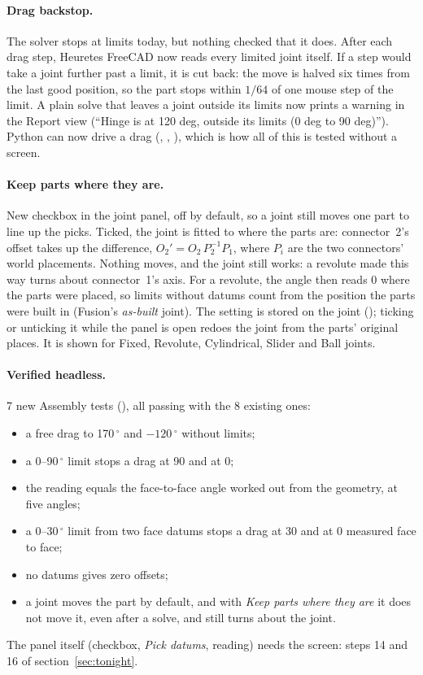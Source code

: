 \paragraph{Drag backstop.} The solver stops at limits today, but nothing checked that it does. After each drag step,
Heuretes FreeCAD now reads every limited joint itself. If a step would take a joint further past a limit, it is cut back:
the move is halved six times from the last good position, so the part stops within $1/64$ of one mouse step of the
limit. A plain solve that leaves a joint outside its limits now prints a warning in the Report view (``Hinge is at
120 deg, outside its limits (0 deg to 90 deg)''). Python can now drive a drag (, ,
), which is how all of this is tested without a screen.

\paragraph{Keep parts where they are.} New checkbox in the joint panel, off by default, so a joint still moves one part
to line up the picks. Ticked, the joint is fitted to where the parts are: connector~2's offset takes up the
difference, $O_2' = O_2\,P_2^{-1}P_1$, where $P_i$ are the two connectors' world placements. Nothing moves, and the
joint still works: a revolute made this way turns about connector~1's axis. For a revolute, the angle then reads 0
where the parts were placed, so limits without datums count from the position the parts were built in (Fusion's
\emph{as-built} joint). The setting is stored on the joint (); ticking or unticking it while the
panel is open redoes the joint from the parts' original places. It is shown for Fixed, Revolute, Cylindrical, Slider
and Ball joints.

\paragraph{Verified headless.} 7 new Assembly tests (), all passing with the 8
existing ones:
\begin{itemize}[nosep]
  \item a free drag to 170\,$^\circ$ and $-120\,^\circ$ without limits;
  \item a 0--90\,$^\circ$ limit stops a drag at 90 and at 0;
  \item the reading equals the face-to-face angle worked out from the geometry, at five angles;
  \item a 0--30\,$^\circ$ limit from two face datums stops a drag at 30 and at 0 measured face to face;
  \item no datums gives zero offsets;
  \item a joint moves the part by default, and with \emph{Keep parts where they are} it does not move it, even after a
        solve, and still turns about the joint.
\end{itemize}
The panel itself (checkbox, \emph{Pick datums}, reading) needs the screen: steps 14 and 16 of
section~\ref{sec:tonight}.

